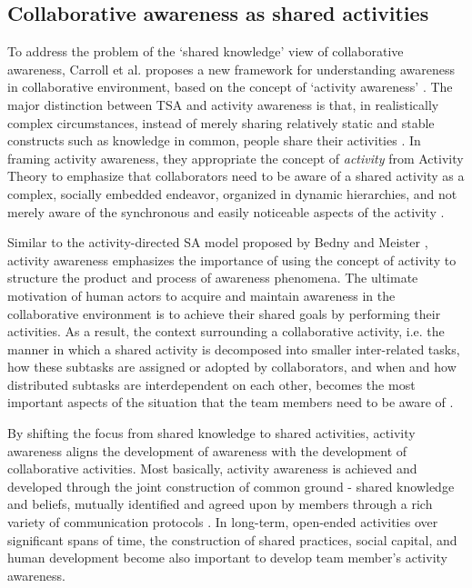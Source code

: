 \subsection{Collaborative awareness as shared activities} %
\label{sub:activity_awareness}
To address the problem of the `shared knowledge' view of collaborative awareness, Carroll et al. proposes a new framework for understanding awareness in collaborative environment, based on the concept of `activity awareness' \cite{carroll2003a,carroll2006a}. The major distinction between TSA and activity awareness is that, in realistically complex circumstances, instead of merely sharing relatively static and stable constructs such as knowledge in common, people share their activities \cite{carroll2006a}. In framing activity awareness, they appropriate the concept of \emph{activity} from Activity Theory to emphasize that collaborators need to be aware of a shared activity as a complex, socially embedded endeavor, organized in dynamic hierarchies, and not merely aware of the synchronous and easily noticeable aspects of the activity \cite{Carroll2009}.

Similar to the activity-directed SA model proposed by Bedny and Meister \cite{Bedny1999}, activity awareness emphasizes the importance of using the concept of activity to structure the product and process of awareness phenomena. The ultimate motivation of human actors to acquire and maintain awareness in the collaborative environment is to achieve their shared goals by performing their activities. As a result, the context surrounding a collaborative activity, i.e. the manner in which a shared activity is decomposed into smaller inter-related tasks, how these subtasks are assigned or adopted by collaborators, and when and how distributed subtasks are interdependent on each other, becomes the most important aspects of the situation that the team members need to be aware of \cite{carroll2003a}.

By shifting the focus from shared knowledge to shared activities, activity awareness aligns the development of awareness with the development of collaborative activities. Most basically, activity awareness is achieved and developed through the joint construction of common ground - shared knowledge and beliefs, mutually identified and agreed upon by members through a rich variety of communication protocols \cite{carroll2006a}. In long-term, open-ended activities over significant spans of time, the construction of shared practices, social capital, and human development become also important to develop team member's activity awareness.


